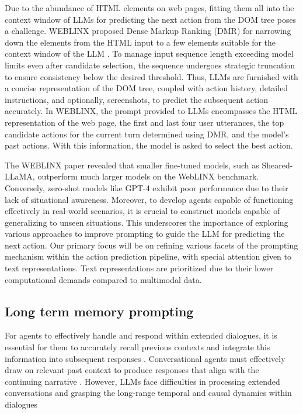 \documentclass[11pt]{article}
\begin{document}
Due to the abundance of HTML elements on web pages, fitting them all into the context window of LLMs for predicting the next action from the DOM tree poses a challenge. WEBLINX proposed Dense Markup Ranking (DMR) for narrowing down the elements from the HTML input to a few elements suitable for the context window of the LLM \cite{lxinghan_2024_weblinx}. To manage input sequence length exceeding model limits even after candidate selection, the sequence undergoes strategic truncation to ensure consistency below the desired threshold. Thus, LLMs are furnished with a concise representation of the DOM tree, coupled with action history, detailed instructions, and optionally, screenshots, to predict the subsequent action accurately. In WEBLINX, the prompt provided to LLMs encompasses the HTML representation of the web page, the first and last four user utterances, the top candidate actions for the current turn determined using DMR, and the model's past actions. With this information, the model is asked to select the best action. 

The WEBLINX paper revealed that smaller fine-tuned models, such as Sheared-LLaMA, outperform much larger models on the WebLINX benchmark. Conversely, zero-shot models like GPT-4 \cite{zheng_2024_gpt4vision} exhibit poor performance due to their lack of situational awareness. Moreover, to develop agents capable of functioning effectively in real-world scenarios, it is crucial to construct models capable of generalizing to unseen situations. This underscores the importance of exploring various approaches to improve prompting to guide the LLM for predicting the next action. Our primary focus will be on refining various facets of the prompting mechanism within the action prediction pipeline, with special attention given to text representations. Text representations are prioritized due to their lower computational demands compared to multimodal data.

\subsection{Long term memory prompting }

For agents to effectively handle and respond within extended dialogues, it is essential for them to accurately recall previous contexts and integrate this information into subsequent responses \cite{Evaluating_Very_Long_Term_Conversational_Memory}. Conversational agents must effectively draw on relevant past context to produce responses that align with the continuing narrative \cite{Evaluating_Very_Long_Term_Conversational_Memory}. However, LLMs face difficulties in processing extended conversations and grasping the long-range temporal and causal dynamics within dialogues \cite{Evaluating_Very_Long_Term_Conversational_Memory, xu-etal-2022-beyond_goldfish_memory_long_term_open_domain_conversation, jang-etal-2023_conversation_chronicles} 
\end{document}
